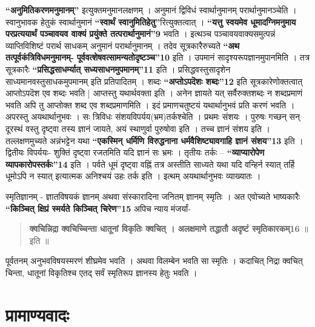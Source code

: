 \textbf{“अनुमितिकरणमनुमानम्”} इत्युक्तमनुमानलक्षणम् । अनुमानं द्विविधं स्वार्थानुमानम् परार्थानुमानञ्चेति । स्वानुभावक हेतुकं स्वार्थानुमानं \textbf{“स्वार्थं स्वानुमितिहेतु”}रित्युक्तत्वात् । \textbf{“यत्तु स्वयमेव धूमादग्निमनुमाय परप्रत्ययार्थं पञ्चावयव वाक्यं प्रयुंक्ते तत्परार्थानुमानं”9} भवति । इत्थञ्च पञ्चावयवाक्यसमुत्पन्नं व्याप्तिविशिष्टं परार्थ साधकम् अनुमानं परार्थानुमानम् । तदेव सूत्रकारैरुच्यते \textbf{“अथ तत्पूर्वकंत्रिविधमनुमानम्- पूर्ववत्शेषवत्सामन्यतोदृष्टञ्च”10} इति । उपमानं सादृश्यरूपज्ञानमुपानमिति । तत्र सूत्रकारैः \textbf{“प्रसिद्धसाधर्म्यात् सध्यसाधनमुपमानम्”11} इति । प्रसिद्धवस्तुसादृशेन साध्यमानवस्तुसाधकमुपमानम् इति प्रतिपादितम् । शब्दः \textbf{“अप्तोऽपदॆशः शब्दः”12} इति सूत्रकारेणोक्तत्वात् आप्तोऽपदॆश एव शब्दः भवति | आप्तस्तु यथार्थवक्ता इति । अनेन ज्ञायते यत् सर्वैरुक्तशब्दः न शब्दप्रमाणं भवति अपि तु आप्तोक्त शब्द एव शब्दप्रमाणमिति । इदं प्रमाणचतुष्टयं यथार्थानुभवं प्रति करणं भवति । अपरस्तु अयथार्थानुभवः । सः त्रिविधः संशयविपर्यय(भ्रम)तर्कश्चेति । प्रथमः संशयः । पुरुषः गच्छन् सन् दूरस्थं वस्तु दृष्ट्वा तस्य ज्ञानं जायते, अयं स्थाणुर्वा पुरुषोवा इति । तच्च ज्ञानं संशय इति । तल्लक्षणमुच्यते अन्नंभट्टेन यथा \textbf{“एकस्मिन् धर्मिणि विरुद्धनाना धर्मवैशिष्ट्यावगाहि ज्ञानं संशय”13} इति । द्वितीयः विपर्ययः- शुक्तिं दृष्ट्वा रजतमिति यदि ज्ञानं सः भ्रमः । तृतीयः तर्कः – \textbf{“व्याप्यारोपेण व्यापकारोपस्तर्कः”14} इति । पर्वते धूमं दृष्ट्वा वह्निं तत्र अस्तीति साध्यते यथा यदि वन्हिर्न स्यात् तर्हि धूमोऽपि न स्यात् इत्यात्मक अनिश्चयं उहः तर्क इति । इत्थम् अयथार्थानुभवः व्याख्यातः ।

स्मृतिज्ञानम् - ज्ञातविषयकं ज्ञानम् अथवा संस्कारादिना जनितम् ज्ञानम् स्मृतिः । अत एवोच्यते भाष्यकारैः \textbf{“किञ्चित् क्षिप्रं स्मर्यते किञ्चित् चिरेण”15} अपिच न्याय मंजर्यां-
\begin{verse}
\textbf{क्वचिन्निद्रा क्वचिच्चिन्ता धातूनां विकृतिः क्वचित् ।
अलक्षमाणे तद्धातौ अदृष्टं स्मृतिकारकम्16} ॥इति ॥
\end{verse}
पूर्वतनम् अनुभवविषयस्मरणं शीघ्रमेव भवति । अथवा विलम्बेन भवति सा स्मृतिः । कदाचित् निद्रा क्वचित् चिन्ता, धातूनां विकृतिश्च एतद् सर्वं स्मृतिरूप ज्ञानस्य हेतुः भवति ।

\section*{प्रामाण्यवादः}

